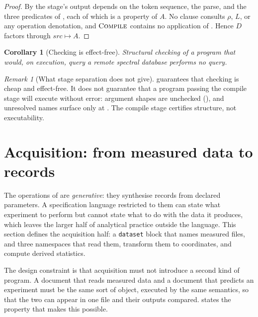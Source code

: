 \documentclass[11pt,twocolumn,a4paper]{article}
\theoremstyle{ssthm}
\newtheorem{corollary}[theorem]{Corollary}
\theoremstyle{definition}
\theoremstyle{remark}
\newtheorem{remark}[theorem]{Remark}
\newcommand{\shk}[1]{\texttt{#1}}
\newcommand{\Env}{\rho}
\begin{document}
\begin{proof}
By  the stage's output depends on the token
sequence, the parse, and the three predicates of
, each of which is a property of $A$. No clause
consults $\Env$, $L$, or any operation denotation, and $\textsc{Compile}$
contains no application of . Hence $D$ factors through
$\mathit{src}\mapsto A$.
\end{proof}

\begin{corollary}[Checking is effect-free]
\label{cor:effect-free}
Structural checking of a program that would, on execution, query a
remote spectral database performs no query.
\end{corollary}

\begin{remark}[What stage separation does not give]
\label{rem:not-typecheck}
 guarantees that checking is cheap and
effect-free. It does not guarantee that a program passing the compile
stage will execute without error: argument shapes are unchecked
(), and unresolved names surface only at
. The compile stage certifies structure, not
executability.
\end{remark}

\section{Acquisition: from measured data to records}
\label{sec:acquisition}

The operations of  are \emph{generative}: they
synthesise records from declared parameters. A specification language
restricted to them can state what experiment to perform but cannot state
what to do with the data it produces, which leaves the larger half of
analytical practice outside the language. This section defines the
acquisition half: a \shk{dataset} block that names measured files, and
three namespaces that read them, transform them to coordinates, and
compute derived statistics.

The design constraint is that acquisition must not introduce a second
kind of program. A document that reads measured data and a document that
predicts an experiment must be the same sort of object, executed by the
same semantics, so that the two can appear in one file and their outputs
compared.  states the property that makes this
possible.
\end{document}
